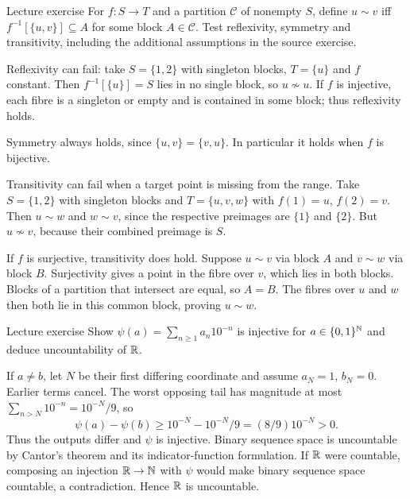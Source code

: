 \begin{exam}{Lecture exercise}
For $f:S\to T$ and a partition $\mathcal C$ of nonempty $S$, define $u\sim v$ iff $f^{-1}[\{u,v\}]\subseteq A$ for some block $A\in\mathcal C$. Test reflexivity, symmetry and transitivity, including the additional assumptions in the source exercise.
\end{exam}
\begin{answer}
Reflexivity can fail: take $S=\{1,2\}$ with singleton blocks, $T=\{u\}$ and $f$ constant. Then $f^{-1}[\{u\}]=S$ lies in no single block, so $u\not\sim u$. If $f$ is injective, each fibre is a singleton or empty and is contained in some block; thus reflexivity holds.

Symmetry always holds, since $\{u,v\}=\{v,u\}$. In particular it holds when $f$ is bijective.

Transitivity can fail when a target point is missing from the range. Take $S=\{1,2\}$ with singleton blocks and $T=\{u,v,w\}$ with $f(1)=u$, $f(2)=v$. Then $u\sim w$ and $w\sim v$, since the respective preimages are $\{1\}$ and $\{2\}$. But $u\not\sim v$, because their combined preimage is $S$.

If $f$ is surjective, transitivity does hold. Suppose $u\sim v$ via block $A$ and $v\sim w$ via block $B$. Surjectivity gives a point in the fibre over $v$, which lies in both blocks. Blocks of a partition that intersect are equal, so $A=B$. The fibres over $u$ and $w$ then both lie in this common block, proving $u\sim w$.
\end{answer}
\begin{exam}{Lecture exercise}
Show $\psi(a)=\sum_{n\ge1}a_n10^{-n}$ is injective for $a\in\{0,1\}^{\mathbb N}$ and deduce uncountability of $\mathbb R$.
\end{exam}
\begin{answer}
If $a\ne b$, let $N$ be their first differing coordinate and assume $a_N=1$, $b_N=0$. Earlier terms cancel. The worst opposing tail has magnitude at most $\sum_{n>N}10^{-n}=10^{-N}/9$, so
\[\psi(a)-\psi(b)\ge10^{-N}-10^{-N}/9=(8/9)10^{-N}>0.\]
Thus the outputs differ and $\psi$ is injective. Binary sequence space is uncountable by Cantor's theorem and its indicator-function formulation. If $\mathbb R$ were countable, composing an injection $\mathbb R\to\mathbb N$ with $\psi$ would make binary sequence space countable, a contradiction. Hence $\mathbb R$ is uncountable.
\end{answer}
